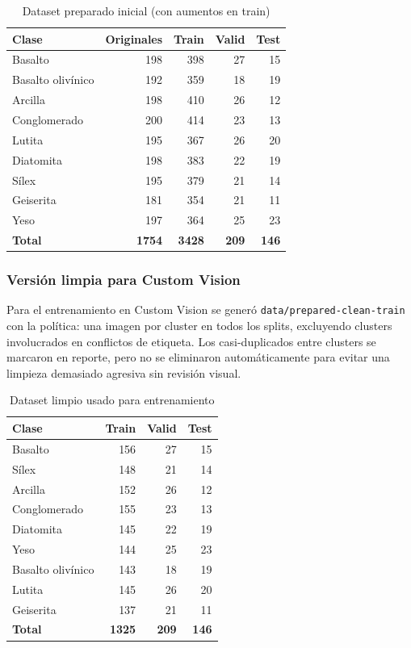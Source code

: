 \begin{table}[H]
  \centering
  \caption{Dataset preparado inicial (con aumentos en train)}
  \label{tab:dataset-prepared}
  \begin{tabular}{@{}lrrrr@{}}
    \toprule
    Clase & Originales & Train & Valid & Test \\
    \midrule
    Basalto & 198 & 398 & 27 & 15 \\
    Basalto olivínico & 192 & 359 & 18 & 19 \\
    Arcilla & 198 & 410 & 26 & 12 \\
    Conglomerado & 200 & 414 & 23 & 13 \\
    Lutita & 195 & 367 & 26 & 20 \\
    Diatomita & 198 & 383 & 22 & 19 \\
    Sílex & 195 & 379 & 21 & 14 \\
    Geiserita & 181 & 354 & 21 & 11 \\
    Yeso & 197 & 364 & 25 & 23 \\
    \midrule
    \textbf{Total} & \textbf{1754} & \textbf{3428} & \textbf{209} & \textbf{146} \\
    \bottomrule
  \end{tabular}
\end{table}

\subsubsection{Versión limpia para Custom Vision}

Para el entrenamiento en Custom Vision se generó \texttt{data/prepared-clean-train}
con la política: una imagen por cluster en todos los splits, excluyendo clusters
involucrados en conflictos de etiqueta. Los casi-duplicados entre clusters se
marcaron en reporte, pero no se eliminaron automáticamente para evitar una limpieza
demasiado agresiva sin revisión visual.

\begin{table}[H]
  \centering
  \caption{Dataset limpio usado para entrenamiento}
  \label{tab:dataset-clean}
  \begin{tabular}{@{}lrrr@{}}
    \toprule
    Clase & Train & Valid & Test \\
    \midrule
    Basalto & 156 & 27 & 15 \\
    Sílex & 148 & 21 & 14 \\
    Arcilla & 152 & 26 & 12 \\
    Conglomerado & 155 & 23 & 13 \\
    Diatomita & 145 & 22 & 19 \\
    Yeso & 144 & 25 & 23 \\
    Basalto olivínico & 143 & 18 & 19 \\
    Lutita & 145 & 26 & 20 \\
    Geiserita & 137 & 21 & 11 \\
    \midrule
    \textbf{Total} & \textbf{1325} & \textbf{209} & \textbf{146} \\
    \bottomrule
  \end{tabular}
\end{table}

